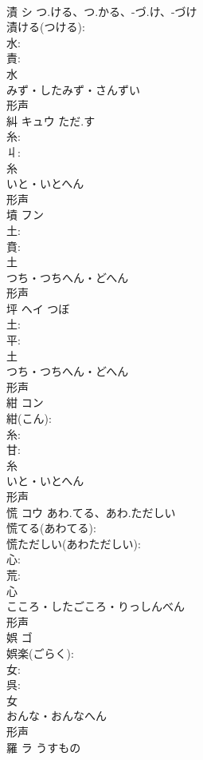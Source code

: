 \documentclass[8pt]{extreport}
\begin{document}
\begin{CJK}{UTF8}{min}
\\	漬	シ	つ.ける、つ.かる、-づ.け、-づけ		
\\	漬ける(つける): 
\\	水: 
\\	責: 
\\	水	
\\	みず・したみず・さんずい	
\\	形声 
\\	糾	キュウ	ただ.す		
\\	糸: 
\\	丩: 
\\	糸	
\\	いと・いとへん	
\\	形声 
\\	墳	フン			
\\	土: 
\\	賁: 
\\	土	
\\	つち・つちへん・どへん	
\\	形声 
\\	坪	ヘイ	つぼ		
\\	土: 
\\	平: 
\\	土	
\\	つち・つちへん・どへん	
\\	形声 
\\	紺	コン			
\\	紺(こん): 
\\	糸: 
\\	甘: 
\\	糸	
\\	いと・いとへん	
\\	形声 
\\	慌	コウ	あわ.てる、あわ.ただしい		
\\	慌てる(あわてる): 
\\	慌ただしい(あわただしい): 
\\	心: 
\\	荒: 
\\	心	
\\	こころ・したごころ・りっしんべん	
\\	形声 
\\	娯	ゴ			
\\	娯楽(ごらく): 
\\	女: 
\\	呉: 
\\	女	
\\	おんな・おんなへん	
\\	形声 
\\	羅	ラ	うすもの		

\end{CJK}
\end{document}

